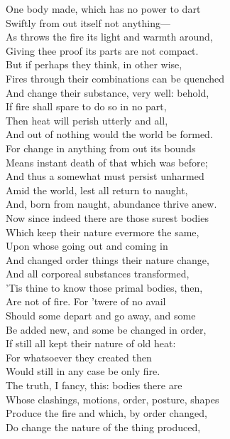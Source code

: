 One body made, which has no power to dart\\
Swiftly from out itself not anything—\\
As throws the fire its light and warmth around,\\
Giving thee proof its parts are not compact.\\
But if perhaps they think, in other wise,\\
Fires through their combinations can be quenched\\
And change their substance, very well: behold,\\
If fire shall spare to do so in no part,\\
Then heat will perish utterly and all,\\
And out of nothing would the world be formed.\\
For change in anything from out its bounds\\
Means instant death of that which was before;\\
And thus a somewhat must persist unharmed\\
Amid the world, lest all return to naught,\\
And, born from naught, abundance thrive anew.\\
Now since indeed there are those surest bodies\\
Which keep their nature evermore the same,\\
Upon whose going out and coming in\\
And changed order things their nature change,\\
And all corporeal substances transformed,\\
'Tis thine to know those primal bodies, then,\\
Are not of fire. For 'twere of no avail\\
Should some depart and go away, and some\\
Be added new, and some be changed in order,\\
If still all kept their nature of old heat:\\
For whatsoever they created then\\
Would still in any case be only fire.\\
The truth, I fancy, this: bodies there are\\
Whose clashings, motions, order, posture, shapes\\
Produce the fire and which, by order changed,\\
Do change the nature of the thing produced,\\
